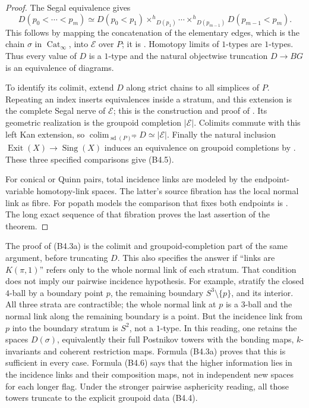\begin{proof}
The Segal equivalence gives
\[
 D(p_0<\cdots<p_m)\simeq
 D(p_0<p_1)\mathbin{\times^h}_{D(p_1)}\cdots
       \mathbin{\times^h}_{D(p_{m-1})}D(p_{m-1}<p_m).
 \tag{B4.6}
\]
This follows by mapping the concatenation of the elementary edges,
which is the chain $\sigma$ in $\operatorname{Cat}_\infty$, into
$\mathcal E$ over $P$; it is
\cite[Lemma 2.7.3]{BGHExodromy}. Homotopy limits of $1$-types are
$1$-types. Thus every value of $D$ is a $1$-type and the natural
objectwise truncation $D\to BG$ is an equivalence of diagrams.

To identify its colimit, extend $D$ along strict chains to all
simplices of $P$. Repeating an index inserts equivalences inside a
stratum, and this extension is the complete Segal nerve of
$\mathcal E$; this is the construction and proof of
\cite[Theorem 2.7.4]{BGHExodromy}. Its geometric realization is
the groupoid completion $|\mathcal E|$. Colimits commute with this
left Kan extension, so
$\operatorname{colim}_{\operatorname{sd}(P)^{\mathrm{op}}}D
\simeq|\mathcal E|$. Finally the natural inclusion
$\operatorname{Exit}(X)\to\operatorname{Sing}(X)$ induces an
equivalence on groupoid completions by
\cite[Corollary A.9.4]{LurieHA}. These three specified comparisons
give (B4.5).

For conical or Quinn pairs, total incidence links are modeled by
the endpoint-variable homotopy-link spaces. The latter's source
fibration has the local normal link as fibre. For popath models
the comparison that fixes both endpoints is
\cite[Theorem 4.9]{Miller2009}. The long exact sequence of that
fibration proves the last assertion of the theorem.
\end{proof}

The proof of (B4.3a) is the colimit and groupoid-completion part of
the same argument, before truncating $D$. This also specifies the
answer if ``links are $K(\pi,1)$'' refers only to the whole normal
link of each stratum. That condition does not imply our pairwise
incidence hypothesis. For example, stratify the closed $4$-ball by
a boundary point $p$, the remaining boundary $S^3\setminus\{p\}$,
and its interior. All three strata are contractible; the whole
normal link at $p$ is a $3$-ball and the normal link along the
remaining boundary is a point. But the incidence link from $p$
into the boundary stratum is $S^2$, not a $1$-type. In this reading,
one retains the spaces $D(\sigma)$, equivalently their full
Postnikov towers with the bonding maps, $k$-invariants and coherent
restriction maps. Formula (B4.3a) proves that this is sufficient in
every case. Formula (B4.6) says that the higher information lies in
the incidence links and their composition maps, not in independent
new spaces for each longer flag. Under the stronger pairwise
asphericity reading, all those towers truncate to the explicit
groupoid data (B4.4).

